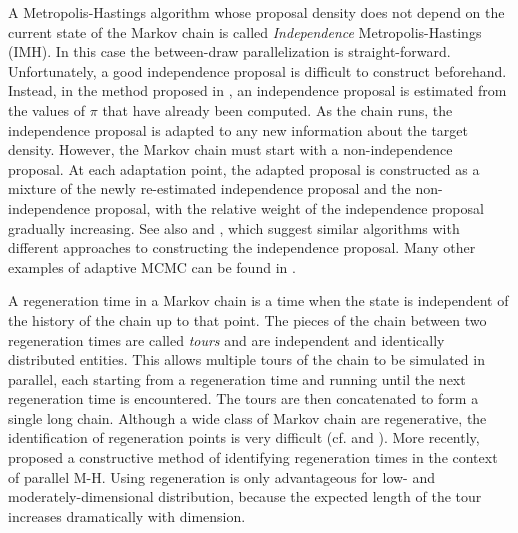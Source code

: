 \documentclass[11pt,letterpaper]{article}       %
\begin{document}
A Metropolis-Hastings algorithm whose proposal density does not depend on the
current state of the Markov chain is called \emph{Independence}
Metropolis-Hastings (IMH).  In this case the between-draw parallelization is
straight-forward.  Unfortunately, a good independence proposal is difficult to
construct beforehand.  Instead, in the method proposed in
\cite{strid2010adaptive}, an independence proposal is estimated from the values
of $\pi$ that have already been computed.  As the chain runs, the independence
proposal is adapted to any new information about the target density.  However,
the Markov chain must start with a non-independence proposal.  At each
adaptation point, the adapted proposal is constructed as a mixture of the newly
re-estimated independence proposal and the non-independence proposal, with the
relative weight of the independence proposal gradually increasing.  See also
\cite{holden2009adaptive} and \cite{giordani2010adaptive}, which suggest
similar algorithms with different approaches to constructing the independence
proposal.  Many other examples of adaptive MCMC can be found in
\cite{roberts2009examples}.

A regeneration time in a Markov chain is a time when the state is independent of
the history of the chain up to that point.  The pieces of the chain between two
regeneration times are called \emph{tours} and are independent and identically
distributed entities.  This allows multiple tours of the chain to be simulated
in parallel, each starting from a regeneration time and running until the next
regeneration time is encountered.  The tours are then concatenated to form a
single long chain.  Although a wide class of Markov chain are regenerative, the
identification of regeneration points is very difficult (cf.
\cite{mykland1995regeneration} and \cite{gilks1998adaptive}).  More recently,
\cite{brockwell2005identification} proposed a constructive method of
identifying regeneration times in the context of parallel M-H.  Using
regeneration is only advantageous for low- and moderately-dimensional
distribution, because the expected length of the tour increases dramatically
with dimension.  
\end{document}
